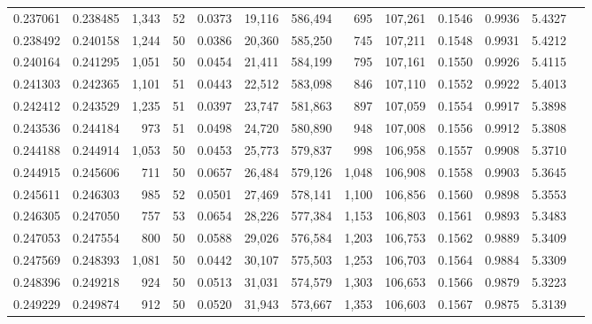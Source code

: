 \begin{tabular}{rrrrrrrrrrrrr}
0.237061 & 0.238485 & 1,343 &  52 &                                     0.0373 &  19,116 & 586,494 &     695 & 107,261 & 0.1546 & 0.9936 & 5.4327 \\
0.238492 & 0.240158 & 1,244 &  50 &                                     0.0386 &  20,360 & 585,250 &     745 & 107,211 & 0.1548 & 0.9931 & 5.4212 \\
0.240164 & 0.241295 & 1,051 &  50 &                                     0.0454 &  21,411 & 584,199 &     795 & 107,161 & 0.1550 & 0.9926 & 5.4115 \\
0.241303 & 0.242365 & 1,101 &  51 &                                     0.0443 &  22,512 & 583,098 &     846 & 107,110 & 0.1552 & 0.9922 & 5.4013 \\
0.242412 & 0.243529 & 1,235 &  51 &                                     0.0397 &  23,747 & 581,863 &     897 & 107,059 & 0.1554 & 0.9917 & 5.3898 \\
0.243536 & 0.244184 &   973 &  51 &                                     0.0498 &  24,720 & 580,890 &     948 & 107,008 & 0.1556 & 0.9912 & 5.3808 \\
0.244188 & 0.244914 & 1,053 &  50 &                                     0.0453 &  25,773 & 579,837 &     998 & 106,958 & 0.1557 & 0.9908 & 5.3710 \\
0.244915 & 0.245606 &   711 &  50 &                                     0.0657 &  26,484 & 579,126 &   1,048 & 106,908 & 0.1558 & 0.9903 & 5.3645 \\
0.245611 & 0.246303 &   985 &  52 &                                     0.0501 &  27,469 & 578,141 &   1,100 & 106,856 & 0.1560 & 0.9898 & 5.3553 \\
0.246305 & 0.247050 &   757 &  53 &                                     0.0654 &  28,226 & 577,384 &   1,153 & 106,803 & 0.1561 & 0.9893 & 5.3483 \\
0.247053 & 0.247554 &   800 &  50 &                                     0.0588 &  29,026 & 576,584 &   1,203 & 106,753 & 0.1562 & 0.9889 & 5.3409 \\
0.247569 & 0.248393 & 1,081 &  50 &                                     0.0442 &  30,107 & 575,503 &   1,253 & 106,703 & 0.1564 & 0.9884 & 5.3309 \\
0.248396 & 0.249218 &   924 &  50 &                                     0.0513 &  31,031 & 574,579 &   1,303 & 106,653 & 0.1566 & 0.9879 & 5.3223 \\
0.249229 & 0.249874 &   912 &  50 &                                     0.0520 &  31,943 & 573,667 &   1,353 & 106,603 & 0.1567 & 0.9875 & 5.3139 \\

\end{tabular}
